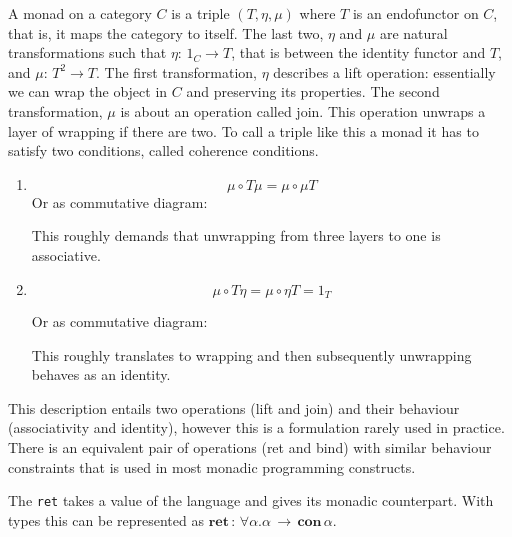 \documentclass[12pt,twoside,notitlepage]{report}
\begin{document}
A monad on a category $ C $ is a triple $ (T, \eta, \mu) $ where $ T $ is an endofunctor on $ C $, that is, it maps the category to itself. The last two, $ \eta $ and $ \mu $ are natural transformations such that $ \eta:\, 1_C \rightarrow T $, that is between the identity functor and $ T $, and $ \mu:\, T^2 \rightarrow T $. The first transformation, $ \eta $ describes a lift operation: essentially we can wrap the object in $ C $ and preserving its properties. The second transformation, $ \mu $ is about an operation called join. This operation unwraps a layer of wrapping if there are two. To call a triple like this a monad it has to satisfy two conditions, called coherence conditions.
\begin{enumerate}

\item{
\[ \mu \circ T \mu = \mu \circ \mu T \]
Or as commutative diagram:
\begin{center}
\end{center}
This roughly demands that unwrapping from three layers to one is associative.



}
\item{
\[ \mu \circ T\eta = \mu \circ \eta T = 1_T \]

Or as commutative diagram:
\begin{center}
\end{center}

This roughly translates to wrapping and then subsequently unwrapping behaves as an identity.
}
\end{enumerate}

This description entails two operations (lift and join) and their behaviour (associativity and identity), however this is a formulation rarely used in practice. There is an equivalent pair of operations (ret and bind) with similar behaviour constraints that is used in most monadic programming constructs. 


The \lstinline|ret| takes a value of the language and gives its monadic counterpart. With types this can be represented as $ \textbf{ret} \, :\, \forall \alpha. \alpha\, \rightarrow\, \textbf{con}\, \alpha $.
\end{document}
